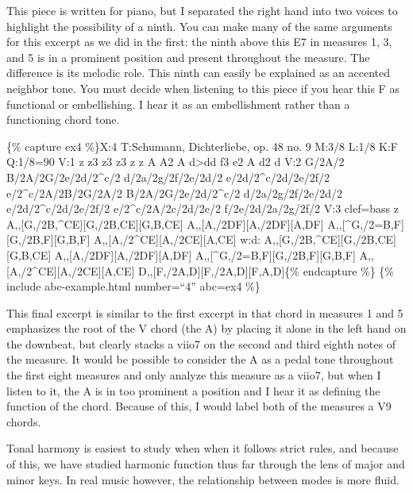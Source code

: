 \documentclass{book}
\begin{document}
This piece is written for piano, but I separated the right hand into two
voices to highlight the possibility of a ninth. You can make many of the same
arguments for this excerpt as we did in the first: the ninth above this E7 in
measures 1, 3, and 5 is in a prominent position and present throughout the
measure. The difference is its melodic role. This ninth can easily be
explained as an accented neighbor tone. You must decide when listening to this
piece if you hear this F as functional or embellishing. I hear it as an
embellishment rather than a functioning chord tone.

\{\% capture ex4 \%\}X:4 T:Schumann, Dichterliebe, op. 48 no. 9 M:3/8 L:1/8
K:F Q:1/8=90 V:1 z\textbar{} z3\textbar{} z3\textbar{} z3\textbar{} z z
A\textbar{} A2 A\textbar{} d\textgreater dd\textbar{} f3\textbar{} e2
A\textbar{} d2 d\textbar{]} V:2 G/2A/2\textbar{}
B/2A/2G/2e/2d/2\^{}c/2\textbar{} d/2a/2g/2f/2e/2d/2\textbar{}
e/2d/2\^{}c/2d/2e/2f/2\textbar{} e/2\^{}c/2A/2B/2G/2A/2\textbar{}
B/2A/2G/2e/2d/2\^{}c/2\textbar{} d/2a/2g/2f/2e/2d/2\textbar{}
e/2d/2\^{}c/2d/2e/2f/2\textbar{} e/2\^{}c/2A/2c/2d/2e/2\textbar{}
f/2e/2d/2a/2g/2f/2\textbar{]} V:3 clef=bass z\textbar{}
A,,{[}G,/2B,\^{}CE{]}{[}G,/2B,CE{]}{[}G,B,CE{]}\textbar{}
A,,{[}A,/2DF{]}{[}A,/2DF{]}{[}A,DF{]}\textbar{}
A,,{[}\^{}G,/2=B,F{]}{[}G,/2B,F{]}{[}G,B,F{]}\textbar{}
A,,{[}A,/2\^{}CE{]}{[}A,/2CE{]}{[}A,CE{]}\textbar{} w:d:
A,,{[}G,/2B,\^{}CE{]}{[}G,/2B,CE{]}{[}G,B,CE{]}\textbar{}
A,,{[}A,/2DF{]}{[}A,/2DF{]}{[}A,DF{]}\textbar{}
A,,{[}\^{}G,/2=B,F{]}{[}G,/2B,F{]}{[}G,B,F{]}\textbar{}
A,,{[}A,/2\^{}CE{]}{[}A,/2CE{]}{[}A,CE{]}\textbar{}
D,,{[}F,/2A,D{]}{[}F,/2A,D{]}{[}F,A,D{]}\textbar{]}\{\% endcapture \%\} \{\%
include abc-example.html number=``4'' abc=ex4 \%\}

This final excerpt is similar to the first excerpt in that chord in measures 1
and 5 emphasizes the root of the V chord (the A) by placing it alone in the
left hand on the downbeat, but clearly stacks a viio7 on the second and third
eighth notes of the measure. It would be possible to consider the A as a pedal
tone throughout the first eight measures and only analyze this measure as a
viio7, but when I listen to it, the A is in too prominent a position and I
hear it as defining the function of the chord. Because of this, I would label
both of the measures a V9 chords.

Tonal harmony is easiest to study when when it follows strict rules, and
because of this, we have studied harmonic function thus far through the lens
of major and minor keys. In real music however, the relationship between modes
is more fluid.
\end{document}
